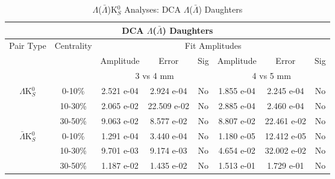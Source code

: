 \documentclass[../AnalysisNoteJBuxton.tex]{subfiles}
\begin{document}
\begin{table}
 \centering
 \begin{tabular}{|c|c|c|c|c||c|c|c|}
  \multicolumn{8}{c}{DCA $\Lambda$($\bar{\Lambda}$) Daughters} \\
  \hline
  \multirow{3}{*}{Pair Type} & \multirow{3}{*}{Centrality} & \multicolumn{6}{c|}{Fit Amplitudes} \\
  \cline{3-8}
   & & Amplitude & Error & Sig & Amplitude & Error & Sig \\  
  \cline{3-8}
   & & \multicolumn{3}{c||}{3 vs 4 mm} & \multicolumn{3}{c|}{4 vs 5 mm} \\  
  \hline  
  \multirow{3}{*}{$\Lambda$K$^{0}_{S}$}  
   &  0-10\% & 2.521 e-04 & 2.924 e-04 & No & 1.855 e-04 & 2.245 e-04 & No \\
   & 10-30\% & 2.065 e-02 & 22.509 e-02 & No & 2.885 e-04 & 2.460 e-04 & No \\
   & 30-50\% & 9.063 e-02 & 8.577 e-02 & No & 8.807 e-02 & 22.461 e-02 & No \\
  \hline  
  \multirow{3}{*}{$\bar{\Lambda}$K$^{0}_{S}$}  
   &  0-10\% & 1.291 e-04 & 3.440 e-04 & No & 1.180 e-05 & 12.412 e-05 & No \\
   & 10-30\% & 9.701 e-03 & 9.174 e-03 & No & 4.654 e-02 & 32.002 e-02 & No \\
   & 30-50\% & 1.187 e-02 & 1.435 e-02 & No & 1.513 e-01 & 1.729 e-01 & No \\
  \hline
 \end{tabular}
 \caption{$\Lambda$($\bar{\Lambda}$)K$^{0}_{S}$ Analyses: DCA $\Lambda$($\bar{\Lambda}$) Daughters}
 \label{tab:LamDaughtersDcaLamK0}
\end{table}
\end{document}
